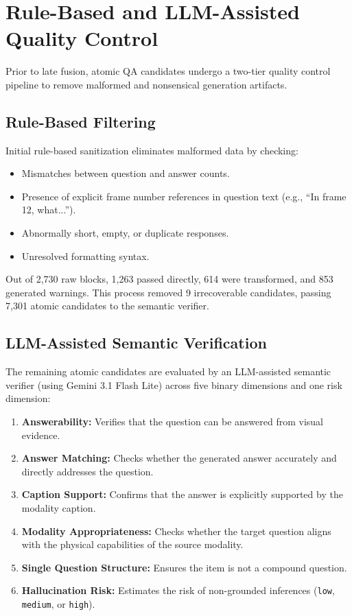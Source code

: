 \section{Rule-Based and LLM-Assisted Quality Control}
\label{sec:quality_control}

Prior to late fusion, atomic QA candidates undergo a two-tier quality control pipeline to remove malformed and nonsensical generation artifacts.

\subsection{Rule-Based Filtering}

Initial rule-based sanitization eliminates malformed data by checking:
\begin{itemize}
    \item Mismatches between question and answer counts.
    \item Presence of explicit frame number references in question text (e.g., ``In frame 12, what...'').
    \item Abnormally short, empty, or duplicate responses.
    \item Unresolved formatting syntax.
\end{itemize}
Out of 2,730 raw blocks, 1,263 passed directly, 614 were transformed, and 853 generated warnings. This process removed 9 irrecoverable candidates, passing 7,301 atomic candidates to the semantic verifier.

\subsection{LLM-Assisted Semantic Verification}

The remaining atomic candidates are evaluated by an LLM-assisted semantic verifier (using Gemini 3.1 Flash Lite) across five binary dimensions and one risk dimension:
\begin{enumerate}
    \item \textbf{Answerability:} Verifies that the question can be answered from visual evidence.
    \item \textbf{Answer Matching:} Checks whether the generated answer accurately and directly addresses the question.
    \item \textbf{Caption Support:} Confirms that the answer is explicitly supported by the modality caption.
    \item \textbf{Modality Appropriateness:} Checks whether the target question aligns with the physical capabilities of the source modality.
    \item \textbf{Single Question Structure:} Ensures the item is not a compound question.
    \item \textbf{Hallucination Risk:} Estimates the risk of non-grounded inferences (\texttt{low}, \texttt{medium}, or \texttt{high}).
\end{enumerate}


